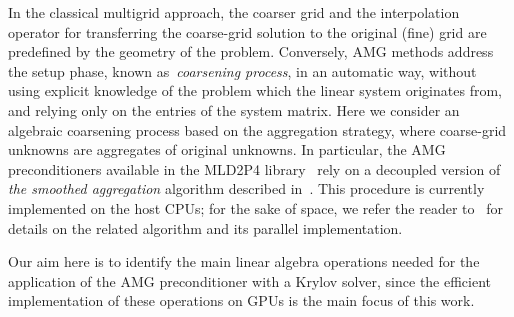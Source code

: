 In the classical multigrid approach, the coarser grid and the interpolation
operator for transferring the coarse-grid solution to the original (fine) grid are
predefined by the geometry of the problem. Conversely,
AMG methods address the setup phase, known as~\emph{coarsening process},
in an automatic way, without using explicit knowledge of the
problem which the linear system originates from, and relying only on the entries of
the system matrix. Here we consider
an algebraic coarsening process based on the aggregation strategy,
where coarse-grid unknowns are aggregates of original
unknowns. In particular, the AMG preconditioners available in the MLD2P4
library~\cite{mld-toms} rely
on a decoupled version of \emph{the smoothed aggregation} algorithm
described in~\cite{BrezinaVanek96,BrezinaVanek99}. This procedure is
currently implemented on the host CPUs; for the sake of space,
we refer the reader to~\cite{mld2p4-2-guide} for details on the related
algorithm and its parallel implementation.

Our aim here is to identify the main linear algebra
operations needed for the application of the AMG preconditioner with
a Krylov solver, since the efficient implementation of these operations on
GPUs is the main focus of this work. 

